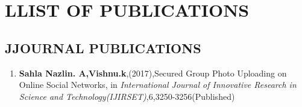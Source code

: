 \chapter*{\fontsize{16}LLIST OF PUBLICATIONS}\label{publications}
  \label{page:publications}
\begin{publications}

\section*{\fontsize{12}JJOURNAL PUBLICATIONS}




 
 \begin{enumerate}
 \item   \textbf{Sahla Nazlin. A,Vishnu.k},(2017),Secured Group Photo Uploading on Online Social Networks, in \textit{International Journal of  Innovative Research in Science and Technology(IJIRSET)},6,3250-3256(Published)


\end{enumerate}
\end{publications}
